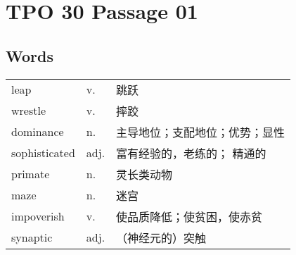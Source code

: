 \section{TPO 30 Passage 01}

\subsection{Words}

\begin{tabular}{lll}
    leap          & v.   & 跳跃              \\
    wrestle       & v.   & 摔跤              \\
    dominance     & n.   & 主导地位；支配地位；优势；显性 \\
    sophisticated & adj. & 富有经验的，老练的； 精通的  \\
    primate       & n.   & 灵长类动物           \\
    maze          & n.   & 迷宫              \\
    impoverish    & v.   & 使品质降低；使贫困，使赤贫   \\
    synaptic      & adj. & （神经元的）突触        \\
\end{tabular}

